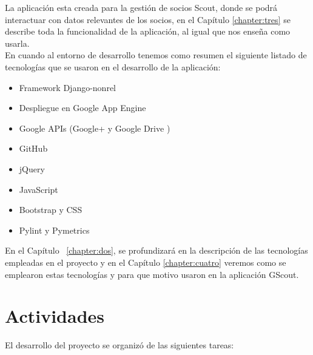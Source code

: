 La aplicación esta creada para la gestión de socios Scout, donde se podrá interactuar con datos relevantes de los socios, en el Capítulo \ref{chapter:tres}
se describe toda la funcionalidad de la aplicación, al igual que nos enseña como usarla.\\

En cuando al entorno de desarrollo tenemos como resumen el siguiente listado de tecnologías que se usaron en el desarrollo de la aplicación:\\

\begin{itemize}
  \item Framework Django-nonrel \cite{URL:DjangoNonrel}
  \item Despliegue en Google App Engine \cite{URL:GAE}
  \item Google APIs (Google+ \cite{URL:GooglePlus} y Google Drive \cite{URL:GoogleDrive}) 
  \item GitHub \cite{URL:GitHub}
  \item jQuery \cite{URL:jQuery}
  \item JavaScript \cite{URL:JavaScript}
  \item Bootstrap \cite{URL:Bootstrap} y CSS \cite{URL:CSS}
  \item Pylint \cite{URL:Pylint} y Pymetrics \cite{URL:Pymetrics}
  
\end{itemize}
En el Capítulo ~\ref{chapter:dos}, se profundizará en la descripción de las tecnologías empleadas en el proyecto y en el Capítulo \ref{chapter:cuatro} 
veremos como se emplearon estas tecnologías y para que motivo usaron en la aplicación GScout.\\

\section{Actividades}
\label{1:sec:3}
El desarrollo del proyecto se organizó de las siguientes tareas:


